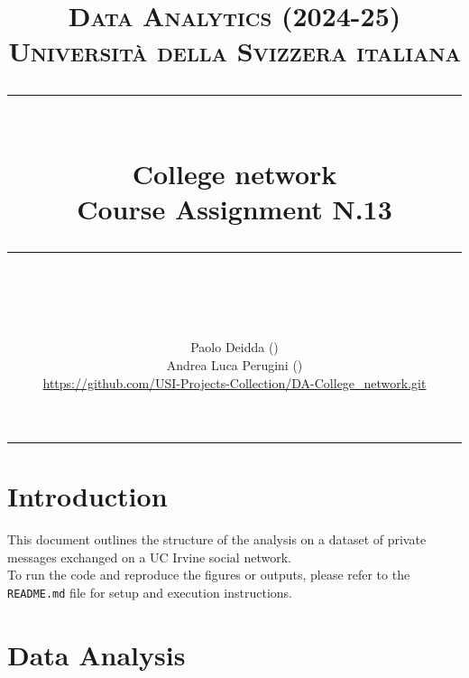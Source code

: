 \documentclass{article}
\title{
	\normalfont\normalsize
	\textsc{Data Analytics (2024-25)\\
	Universit\`a della Svizzera italiana}\\
	\rule{\linewidth}{0.5pt}\\
	{\huge College network\\
	\small Course Assignment N.13}\\
	\rule{\linewidth}{1pt}\\
	\vspace{5pt}
}
\author{
	Paolo Deidda (\text{paolo.deidda@usi.ch}) \\ 
	Andrea Luca Perugini (\text{andrea.perugini@usi.ch})\\
	\url{https://github.com/USI-Projects-Collection/DA-College_network.git}
	}
\begin{document}
\maketitle

\tableofcontents

\vspace{100pt}
\rule{\linewidth}{1pt}

\section*{Introduction}
This document outlines the structure of the analysis on a dataset of private messages exchanged on a UC Irvine social network.\\

To run the code and reproduce the figures or outputs, please refer to the \texttt{README.md} file for setup and execution instructions.
\newpage

\section{Data Analysis}



% 

\end{document}
